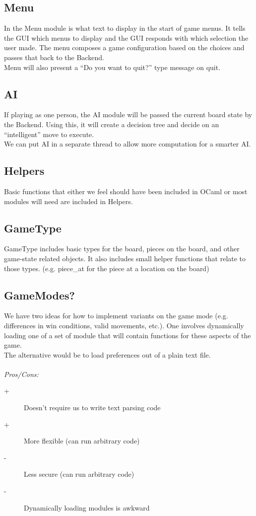 \documentclass[11pt, oneside]{article}
\begin{document}
\subsection{Menu}
In the Menu module is what text to display in the start of game menus. It tells
the GUI which menus to display and the GUI responds with which selection the
user made. The menu composes a game configuration based on the choices and
passes that back to the Backend.\\
Menu will also present a ``Do you want to quit?'' type message on quit.

\subsection{AI}
If playing as one person, the AI module will be passed the current board state
by the Backend. Using this, it will create a decision tree and decide on an
``intelligent'' move
to execute.\\
We can put AI in a separate thread to allow more computation for a smarter AI.

\subsection{Helpers}
Basic functions that either we feel should have been included in OCaml or most
modules will need are included in Helpers.

\subsection{GameType}
GameType includes basic types for the board, pieces on the board, and other
game-state related objects. It also includes small helper functions that relate
to those types. (e.g. piece\_at for the piece at a location on the board)

\subsection{GameModes?}
We have two ideas for how to implement variants on the game mode (e.g.
differences in win conditions, valid movements, etc.). One involves dynamically
loading one of a set of module that will contain functions for these aspects of
the game.\\
The alternative would be to load preferences out of a plain text file.\\\\
\textit{Pros/Cons:}
\begin{description}
\item[+] Doesn't require us to write text parsing code
\item[+] More flexible (can run arbitrary code)
\item[-] Less secure (can run arbitrary code)
\item[-] Dynamically loading modules is awkward
\end{description}
\end{document}
